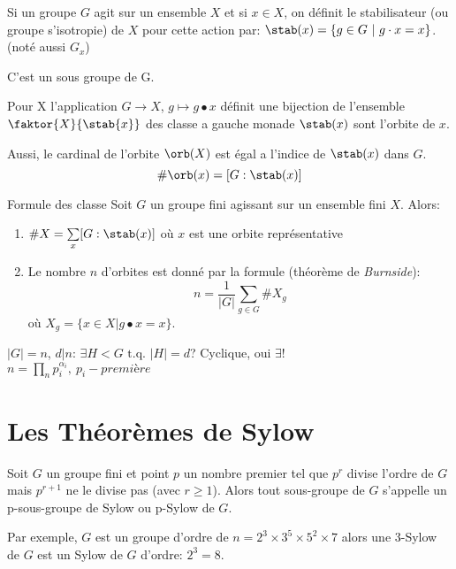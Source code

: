 \begin{definition}
	Si un groupe $G$ agit sur un ensemble $X$ et si $x\in X$, on définit le stabilisateur (ou groupe s'isotropie) de $X$ pour cette action par: $\stab(x)=\{g\in G\ |\ g\cdot x=x\}$. (noté aussi $G_x$)
\end{definition}

\begin{proposition}
	C'est un sous groupe de G. 
\end{proposition}

\begin{proposition} 
	Pour X l'application $G\rightarrow X$, $g\mapsto g•x$ définit une bijection de l'ensemble $\faktor{X}{\stab{x}}$ des classe a gauche monade $\stab(x)$ sont l'orbite de $x$.
\end{proposition}

Aussi, le cardinal de l'orbite $\orb(X)$ est égal a l'indice de $\stab(x)$ dans $G$.
$$\#\orb(x) =[G: \stab(x)]$$

\begin{theorem}{Formule des classe}
	Soit $G$ un groupe fini agissant sur un ensemble fini $X$. Alors:
	\begin{enumerate}
		\item $\#X=\sum\limits_x[G: \stab(x)]$ où $x$ est une orbite représentative
		\item Le nombre $n$ d'orbites est donné par la formule (théorème de \emph{Burnside}):
		$$n=\frac{1}{|G|}\sum\limits_{g\in G}\#X_g$$
		où $X_g=\{x\in X | g•x=x\}$.
	\end{enumerate}
\end{theorem}

\begin{remark}
	$|G|=n$, $d | n$: $\exists H<G \text{ t.q. } |H|=d$? Cyclique, oui $\exists !$\\
	$n=\prod\limits_n p_i^{\alpha_i},\ p_i - première$
\end{remark}

\section{Les Théorèmes de Sylow}

Soit $G$ un groupe fini et point $p$ un nombre premier tel que $p^r$ divise l'ordre de $G$ mais $p^{r+1}$ ne le divise pas (avec $r\geq 1$).
Alors tout sous-groupe de $G$ s'appelle un p-sous-groupe de Sylow ou p-Sylow de $G$.

Par exemple, $G$ est un groupe d'ordre de $n=2^3\times 3^5\times 5^2 \times 7$
alors une 3-Sylow de $G$ est un Sylow de $G$ d'ordre: $2^3=8$.

